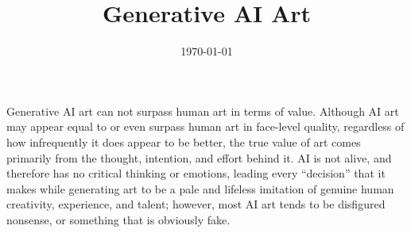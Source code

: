\documentclass[12pt, letterpaper]{article}
\title{Generative AI Art}
\date{\today}
\begin{document}
\maketitle
Generative AI art can not surpass human art in terms of value. Although AI art may appear equal to or even surpass human art in face-level quality, regardless of how infrequently it does appear to be better, the true value of art comes primarily from the thought, intention, and effort behind it. AI is not alive, and therefore has no critical thinking or emotions, leading every ``decision'' that it makes while generating art to be a pale and lifeless imitation of genuine human creativity, experience, and talent; however, most AI art tends to be disfigured nonsense, or something that is obviously fake.
\end{document}
